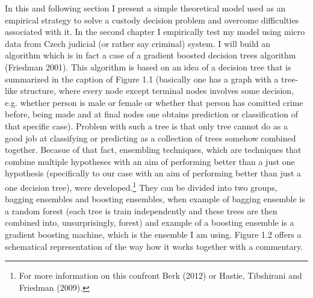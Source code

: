 \documentclass[12pt, twoside,openany]{book} %
\begin{document}
In this and following section I present a simple theoretical model used as an empirical strategy to solve a custody decision problem and overcome difficulties associated with it. In the second chapter I empirically test my model using micro data from Czech judicial (or rather say criminal) system. I will build an algorithm which is in fact a case of a gradient boosted decision trees algorithm (Friedman 2001). This algorithm is based on an idea of a decision tree that is summarized in the caption of Figure 1.1 (basically one has a graph with a tree-like structure, where every node except terminal nodes involves  some decision, e.g. whether person is male or female or whether that person has comitted crime before, being made and at final nodes one obtains prediction or classification of that specific case).\newline
Problem with such a tree is that only tree cannot do as a good job at classifying or predicting as a collection of trees somehow combined together. Becasue of that fact, ensembling techniques, which are techniques that combine multiple hypotheses with an aim of performing better than a just one hypothesis (specifically to our case with an aim of performing better than just a one decision tree), were developed.\footnote{For more information on this confront Berk (2012) or Hastie, Tibshirani and Friedman (2009).} They can be divided into two groups, bagging ensembles and boosting ensembles, when example of bagging ensemble is a random forest (each tree is train independently and these trees are then combined into, unsurprisingly, forest) and example of a boosting ensemble is a gradient boosting machine, which is the ensemble I am using. Figure 1.2 offers a schematical representation of the way how it works together with a commentary. \newline
\end{document}
